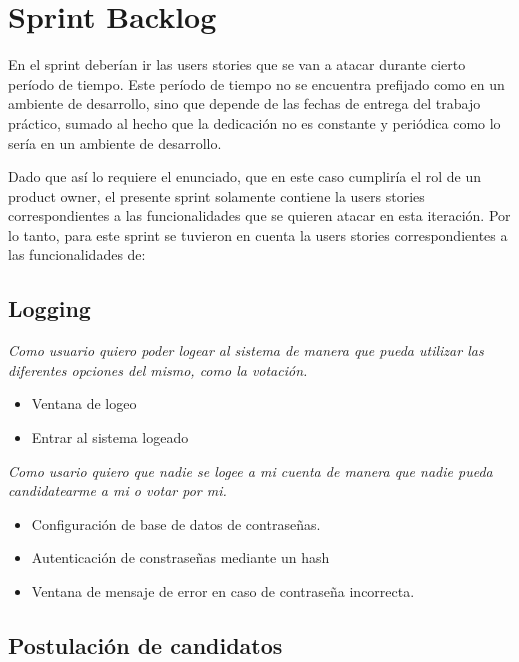 \section{Sprint Backlog}

En el sprint deber\'ian ir las users stories que se van a atacar durante cierto per\'iodo de tiempo. 
Este per\'iodo de tiempo no se encuentra prefijado como en un ambiente de desarrollo, sino que depende de las fechas de entrega del trabajo pr\'actico, sumado al hecho que la dedicaci\'on no es constante y peri\'odica como lo ser\'ia en un ambiente de desarrollo.

\bigskip

Dado que as\'i lo requiere el enunciado, que en este caso cumplir\'ia el rol de un product owner, el presente sprint solamente contiene la users stories correspondientes a las funcionalidades que se quieren atacar en esta iteraci\'on. Por lo tanto, para este sprint se tuvieron en cuenta la users stories correspondientes a las funcionalidades de:

\bigskip

\subsection*{Logging}

\textsl{Como usuario quiero poder logear al sistema de manera que pueda utilizar las diferentes opciones del mismo, como la votaci\'on.}

\begin{itemize}
 \item Ventana de logeo
 \item Entrar al sistema logeado
\end{itemize}

\medskip

\textsl{Como usario quiero que nadie se logee a mi cuenta de manera que nadie pueda candidatearme a mi o votar por mi.}

\begin{itemize}
 \item Configuraci\'on de base de datos de contrase\~nas.
 \item Autenticaci\'on de constrase\~nas mediante un hash
 \item Ventana de mensaje de error en caso de contrase\~na incorrecta.
\end{itemize}
\bigskip

\subsection*{Postulaci\'on de candidatos}

